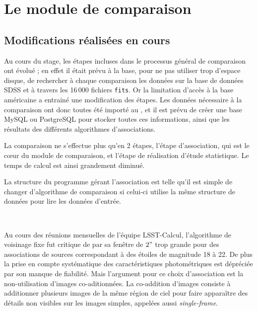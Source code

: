 
\section{Le module de comparaison}

	\subsection{Modifications réalisées en cours}

Au cours du stage, les étapes incluses dans le processus général de comparaison ont évolué ; en effet il était prévu à la base, pour ne pas utiliser trop d'espace disque, de rechercher à chaque comparaison les données sur la base de données SDSS et à travers les 16\,000 fichiers \texttt{fits}. Or la limitation d'accès à la base américaine a entrainé une modification des étapes. Les données nécessaire à la comparaison ont donc toutes été importé au \CC{}, et il est prévu de créer une base MySQL ou PostgreSQL pour stocker toutes ces informations, ainsi que les résultats des différents algorithmes d'associations.

La comparaison ne s'effectue plus qu'en 2 étapes, l'étape d'association, qui est le c\oe{}ur du module de comparaison, et l'étape de réalisation d'étude statistique.  Le temps de calcul est ainsi grandement diminué.

La structure du programme \Cpp{} gérant l'association est telle qu'il est simple de changer d'algorithme de comparaison si celui-ci utilise la même structure de données pour lire les données d'entrée.

\

Au cours des réunions mensuelles de l'équipe LSST-Calcul, l'algorithme de voisinage fixe fut critique de par sa fenêtre de $2"$ trop grande pour des associations de sources correspondant à des étoiles de magnitude 18 à 22. De plus la prise en compte systématique des caractéristiques photométriques est dépréciée par son manque de fiabilité. Mais l'argument pour ce choix d'association est la non-utilisation d'images co-aditionnées. La co-addition d'images consiste à additionner plusieurs images de la même région de ciel pour faire apparaître des détails non visibles sur les images simples, appelées aussi \emph{single-frame}.


